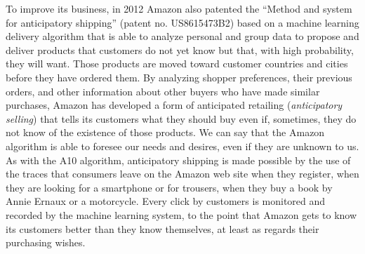 To improve its business, in 2012 Amazon also patented the ``Method and system for anticipatory shipping'' (patent no. US8615473B2) based on a machine learning delivery algorithm that is able to analyze personal and group data to propose and deliver products that customers do not yet know but that, with high probability, they will want. Those products are moved toward customer countries and cities before they have ordered them. By analyzing shopper preferences, their previous orders, and other information about other buyers who have made similar \hbox{purchases,} Amazon has developed a form of anticipated retailing (\textit{anticipatory \hbox{selling}}) that tells its customers what they should buy even if, sometimes, they do not know of the existence of those products. We can say that the Amazon algorithm is able to foresee our needs and desires, even if they are unknown to us. As with the A10 algorithm, anticipatory shipping is made possible by the use of the traces that consumers leave on the Amazon web site when they \hbox{register}, when they are looking for a smartphone or for trousers, when they buy a book by Annie Ernaux or a motorcycle. Every click by customers is monitored and recorded by the machine learning system, to the point that Amazon gets to know its customers better than they know themselves, at least as regards their purchasing wishes.

